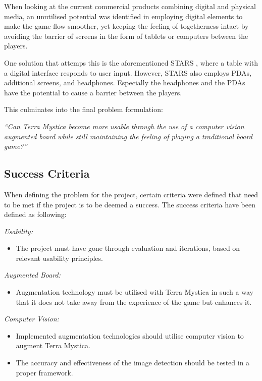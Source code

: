 When looking at the current commercial products combining digital and physical media, an unutilised potential was identified in employing digital elements to make the game flow smoother, yet keeping the feeling of togetherness intact by avoiding the barrier of screens in the form of tablets or computers between the players. 

One solution that attemps this is the aforementioned STARS \citep{magStars}, where a table with a digital interface responds to user input. However, STARS also employs PDAs, additional screens, and headphones. Especially the headphones and the PDAs have the potential to cause a barrier between the players.

This culminates into the final problem formulation:

\textit{“Can Terra Mystica become more usable through the use of a computer vision augmented board while still maintaining the feeling of playing a traditional board game?”}

\subsection{Success Criteria}\label{sec:SuccessCriteria}
When defining the problem for the project, certain criteria were defined that need to be met if the project is to be deemed a success. The success criteria have been defined as following:

\textit{Usability:}
\begin{itemize}
	\item The project must have gone through evaluation and iterations, based on relevant usability principles.
\end{itemize}
\textit{Augmented Board:}
\begin{itemize}
	\item Augmentation technology must be utilised with Terra Mystica in such a way that it does not take away from the experience of the game but enhances it.
\end{itemize}
\textit{Computer Vision:}
\begin{itemize}
	\item Implemented augmentation technologies should utilise computer vision to augment Terra Mystica.
	\item The accuracy and effectiveness of the image detection should be tested in a proper framework.
\end{itemize} 